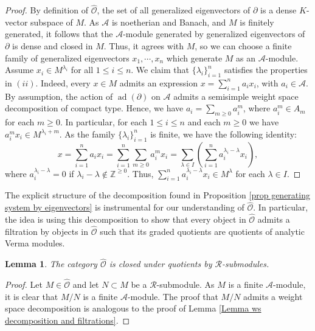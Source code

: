 \documentclass{amsart}
\newtheorem{Lemma}[defi]{Lemma}
\newcommand{\OX}{\mathcal{O}}
\begin{document}
\begin{proof}
By definition of $\widehat{\OX}$, the set of all generalized eigenvectors of $\partial$ is a dense $K$-vector subspace of $M$. As $\mathscr{A}$ is noetherian and Banach, and $M$ is finitely generated, it follows that the $\mathscr{A}$-module generated by generalized eigenvectors of $\partial$ is dense and closed in $M$. Thus, it agrees with $M$, so we can choose a finite family of generalized eigenvectors $x_1,\cdots,x_n$ which generate $M$ as an $\mathscr{A}$-module. Assume $x_i\in M^{\lambda_i}$ for all $1\leq i\leq n$. We claim that $\{\lambda_i\}_{i=1}^n$ satisfies the properties in $(ii)$.  Indeed, every $x\in M$ admits an expression $x=\sum_{i=1}^na_ix_i$, with $a_i\in \mathscr{A}$. By assumption, the action of $\operatorname{ad}(\partial)$ on $\mathscr{A}$ admits a semisimple weight space decomposition of compact type. Hence, we have $a_i=\sum_{m\geq 0}a_i^m$, where $a_i^m\in A_m$ for each $m\geq 0$. In particular, for each $1\leq i \leq n$ and each $m\geq 0$ we have $a_i^mx_i\in M^{\lambda_i+m}$. As the family $\{\lambda_i \}_{i=1}^n$ is finite, we have the following identity:
\begin{equation}\label{equation ws decomposition objects of OX}
 x=\sum_{i=1}^na_ix_i=\sum_{i=1}^n\sum_{m\geq 0}a_i^mx_i=\sum_{\lambda \in I}  \left(\sum _{i=1}^na_i^{\lambda_i-\lambda }x_i\right),
\end{equation}
where $a_i^{\lambda_i-\lambda }=0$ if $\lambda_i-\lambda\not \in \mathbb{Z}^{\geq 0}$. Thus, $\sum _{i=1}^na_i^{\lambda_i-\lambda }x_i\in M^{\lambda}$ for each $\lambda \in I$.
\end{proof}
The explicit structure of the decomposition found in Proposition \ref{prop generating system by eigenvectors} is instrumental for our understanding of $\widehat{\OX}$. In particular, the idea is using this decomposition to show that every object in $\widehat{\OX}$ admits a filtration by objects in $\widehat{\OX}$ such that its graded quotients are quotients of analytic Verma modules. 
\begin{Lemma}\label{Lemma start of the filtration by quotients of Verma}
 The category $\widehat{\OX}$ is closed under quotients by $\mathscr{R}$-submodules.
\end{Lemma}
\begin{proof}
Let $M\in \widehat{\OX}$ and let $N\subset M$ be a $\mathscr{R}$-submodule. As $M$ is a finite $\mathscr{A}$-module, it is clear that $M/N$ is a finite $\mathscr{A}$-module. The proof that $M/N$ admits a weight space decomposition is analogous to the proof of Lemma \ref{Lemma ws decomposition and filtrations}.
\end{proof}
\end{document}

